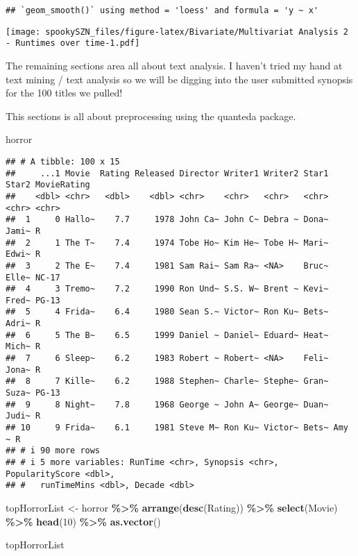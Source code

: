 \documentclass[
]{article}
\newenvironment{Shaded}{\begin{snugshade}}{\end{snugshade}}
\newcommand{\DecValTok}[1]{\textcolor[rgb]{0.00,0.00,0.81}{#1}}
\newcommand{\FunctionTok}[1]{\textcolor[rgb]{0.13,0.29,0.53}{\textbf{#1}}}
\newcommand{\NormalTok}[1]{#1}
\newcommand{\OtherTok}[1]{\textcolor[rgb]{0.56,0.35,0.01}{#1}}
\newcommand{\SpecialCharTok}[1]{\textcolor[rgb]{0.81,0.36,0.00}{\textbf{#1}}}
\begin{document}
\begin{verbatim}
## `geom_smooth()` using method = 'loess' and formula = 'y ~ x'
\end{verbatim}

\texttt{[image: spookySZN\_files/figure-latex/Bivariate/Multivariat Analysis 2 - Runtimes over time-1.pdf]}

The remaining sections area all about text analysis. I haven't tried my
hand at text mining / text analysis so we will be digging into the user
submitted synopsis for the 100 titles we pulled!

This sections is all about preprocessing using the quanteda package.

\begin{Shaded}
\begin{Highlighting}[]
\NormalTok{horror}
\end{Highlighting}
\end{Shaded}

\begin{verbatim}
## # A tibble: 100 x 15
##     ...1 Movie  Rating Released Director Writer1 Writer2 Star1 Star2 MovieRating
##    <dbl> <chr>   <dbl>    <dbl> <chr>    <chr>   <chr>   <chr> <chr> <chr>      
##  1     0 Hallo~    7.7     1978 John Ca~ John C~ Debra ~ Dona~ Jami~ R          
##  2     1 The T~    7.4     1974 Tobe Ho~ Kim He~ Tobe H~ Mari~ Edwi~ R          
##  3     2 The E~    7.4     1981 Sam Rai~ Sam Ra~ <NA>    Bruc~ Elle~ NC-17      
##  4     3 Tremo~    7.2     1990 Ron Und~ S.S. W~ Brent ~ Kevi~ Fred~ PG-13      
##  5     4 Frida~    6.4     1980 Sean S.~ Victor~ Ron Ku~ Bets~ Adri~ R          
##  6     5 The B~    6.5     1999 Daniel ~ Daniel~ Eduard~ Heat~ Mich~ R          
##  7     6 Sleep~    6.2     1983 Robert ~ Robert~ <NA>    Feli~ Jona~ R          
##  8     7 Kille~    6.2     1988 Stephen~ Charle~ Stephe~ Gran~ Suza~ PG-13      
##  9     8 Night~    7.8     1968 George ~ John A~ George~ Duan~ Judi~ R          
## 10     9 Frida~    6.1     1981 Steve M~ Ron Ku~ Victor~ Bets~ Amy ~ R          
## # i 90 more rows
## # i 5 more variables: RunTime <chr>, Synopsis <chr>, PopularityScore <dbl>,
## #   runTimeMins <dbl>, Decade <dbl>
\end{verbatim}

\begin{Shaded}
\begin{Highlighting}[]
\NormalTok{topHorrorList }\OtherTok{\textless{}{-}}\NormalTok{ horror }\SpecialCharTok{\%\textgreater{}\%} 
  \FunctionTok{arrange}\NormalTok{(}\FunctionTok{desc}\NormalTok{(Rating)) }\SpecialCharTok{\%\textgreater{}\%} 
  \FunctionTok{select}\NormalTok{(Movie) }\SpecialCharTok{\%\textgreater{}\%} 
  \FunctionTok{head}\NormalTok{(}\DecValTok{10}\NormalTok{) }\SpecialCharTok{\%\textgreater{}\%} 
  \FunctionTok{as.vector}\NormalTok{()}

\NormalTok{topHorrorList}
\end{Highlighting}
\end{Shaded}
\end{document}
